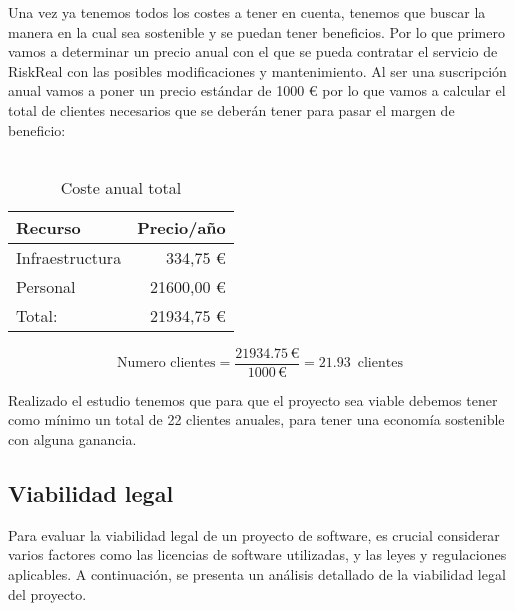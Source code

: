Una vez ya tenemos todos los costes a tener en cuenta, tenemos que buscar la manera en la cual sea sostenible y se puedan tener beneficios. Por lo que primero vamos a determinar un precio anual con el que se pueda contratar el servicio de RiskReal con las posibles modificaciones y mantenimiento.
Al ser una suscripción anual vamos a poner un precio estándar de 1000 € por lo que vamos a calcular el total de clientes necesarios que se deberán tener para pasar el margen de beneficio:
\\
\\
\begin{table}[H]
    \centering
    \begin{tabular}{@{}|l|r|@{}}
         \toprule
        Recurso & Precio/año \\ \midrule
        Infraestructura & 334,75 € \\
        Personal & 21600,00 € \\ \midrule
        Total: & 21934,75 € \\ \bottomrule 
    \end{tabular}
    \caption{Coste anual total}
\end{table}

\begin{equation}
    \text{Numero clientes} = \frac{21934.75\,\text{€}}{1000\,\text{€}} = 21.93\,\text{ clientes}
\end{equation}

Realizado el estudio tenemos que para que el proyecto sea viable debemos tener como mínimo un total de 22 clientes anuales, para tener una economía sostenible con alguna ganancia. 
\subsection{Viabilidad legal}
Para evaluar la viabilidad legal de un proyecto de software, es crucial considerar varios factores como las licencias de software utilizadas, y las leyes y regulaciones aplicables. A continuación, se presenta un análisis detallado de la viabilidad legal del proyecto.

